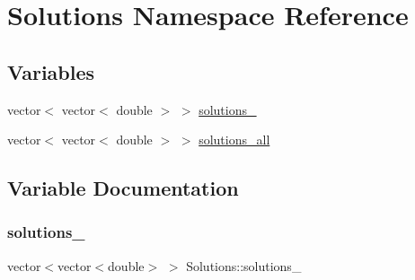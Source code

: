 \hypertarget{namespaceSolutions}{}\section{Solutions Namespace Reference}
\label{namespaceSolutions}
\subsection*{Variables}
\begin{DoxyCompactItemize}
\item 
vector$<$ vector$<$ double $>$ $>$ \mbox{\hyperlink{namespaceSolutions_a719624b0ddd892bf180206d9d4338cd2}{solutions\+\_}}
\item 
vector$<$ vector$<$ double $>$ $>$ \mbox{\hyperlink{namespaceSolutions_a1d52637d01c7e17fcc05a918375a7728}{solutions\+\_\+all}}
\end{DoxyCompactItemize}


\subsection{Variable Documentation}
\mbox{\label{namespaceSolutions_a719624b0ddd892bf180206d9d4338cd2}} 
\subsubsection{\texorpdfstring{solutions\+\_}{solutions\_16}}
{\footnotesize\ttfamily vector$<$vector$<$double$>$ $>$ Solutions\+::solutions\+\_}

